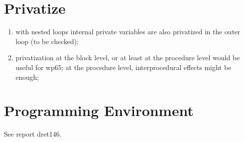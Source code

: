 \section{Privatize}

\begin{enumerate}

  \item with nested loops internal private variables are also privatized
	in the outer loop (to be checked);

  \item privatization at the block level, or at least at the procedure
	level would be useful for wp65; at the procedure level, interprocedural
	effects might be enough;

\end{enumerate}

\section{Programming Environment}

See report dret146.

